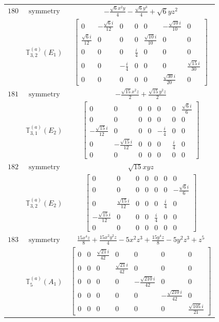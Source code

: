 \documentclass[fleqn,8pt,landscape]{jsarticle}
\begin{document}
\begin{longtable}{ccc}
$ 180 $ & $ \text{symmetry} $ & $ - \frac{\sqrt{6} x^{2} y}{4} - \frac{\sqrt{6} y^{3}}{4} + \sqrt{6} y z^{2} $ \\
$  $ & $ \mathbb{T}_{3,2}^{(a)}(E_{1}) $ & $ \begin{bmatrix} 0 & - \frac{\sqrt{6} i}{12} & 0 & 0 & 0 & - \frac{\sqrt{10} i}{10} & 0 \\ \frac{\sqrt{6} i}{12} & 0 & 0 & 0 & \frac{\sqrt{10} i}{10} & 0 & 0 \\ 0 & 0 & 0 & \frac{i}{4} & 0 & 0 & 0 \\ 0 & 0 & - \frac{i}{4} & 0 & 0 & 0 & \frac{\sqrt{15} i}{30} \\ 0 & 0 & 0 & 0 & 0 & \frac{\sqrt{30} i}{20} & 0 \end{bmatrix} $ \\ \hline
$ 181 $ & $ \text{symmetry} $ & $ - \frac{\sqrt{15} x^{2} z}{2} + \frac{\sqrt{15} y^{2} z}{2} $ \\
$  $ & $ \mathbb{T}_{3,1}^{(a)}(E_{2}) $ & $ \begin{bmatrix} 0 & 0 & 0 & 0 & 0 & 0 & \frac{\sqrt{6} i}{6} \\ 0 & 0 & 0 & 0 & 0 & 0 & 0 \\ - \frac{\sqrt{15} i}{12} & 0 & 0 & 0 & - \frac{i}{4} & 0 & 0 \\ 0 & - \frac{\sqrt{15} i}{12} & 0 & 0 & 0 & \frac{i}{4} & 0 \\ 0 & 0 & 0 & 0 & 0 & 0 & 0 \end{bmatrix} $ \\ \hline
$ 182 $ & $ \text{symmetry} $ & $ \sqrt{15} x y z $ \\
$  $ & $ \mathbb{T}_{3,2}^{(a)}(E_{2}) $ & $ \begin{bmatrix} 0 & 0 & 0 & 0 & 0 & 0 & 0 \\ 0 & 0 & 0 & 0 & 0 & 0 & - \frac{\sqrt{6} i}{6} \\ 0 & \frac{\sqrt{15} i}{12} & 0 & 0 & 0 & \frac{i}{4} & 0 \\ - \frac{\sqrt{15} i}{12} & 0 & 0 & 0 & \frac{i}{4} & 0 & 0 \\ 0 & 0 & 0 & 0 & 0 & 0 & 0 \end{bmatrix} $ \\ \hline
$ 183 $ & $ \text{symmetry} $ & $ \frac{15 x^{4} z}{8} + \frac{15 x^{2} y^{2} z}{4} - 5 x^{2} z^{3} + \frac{15 y^{4} z}{8} - 5 y^{2} z^{3} + z^{5} $ \\
$  $ & $ \mathbb{T}_{5}^{(a)}(A_{1}) $ & $ \begin{bmatrix} 0 & 0 & \frac{\sqrt{21} i}{42} & 0 & 0 & 0 & 0 \\ 0 & 0 & 0 & \frac{\sqrt{21} i}{42} & 0 & 0 & 0 \\ 0 & 0 & 0 & 0 & - \frac{\sqrt{210} i}{42} & 0 & 0 \\ 0 & 0 & 0 & 0 & 0 & - \frac{\sqrt{210} i}{42} & 0 \\ 0 & 0 & 0 & 0 & 0 & 0 & \frac{\sqrt{105} i}{21} \end{bmatrix} $ \\ \hline

\end{longtable}
\end{document}
